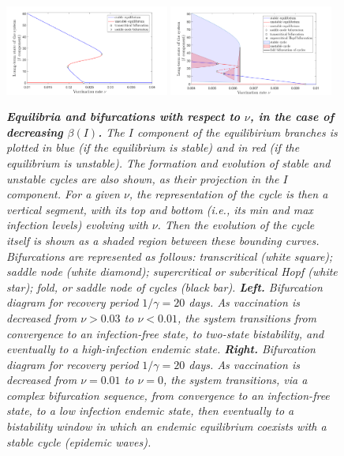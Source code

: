 \documentclass[10pt]{article}
\begin{document}
\begin{figure}[h!]
\begin{center}
\includegraphics[width=0.48\textwidth]{figures/increasing_beta_gamma_20.png}
\includegraphics[width=0.48\textwidth]{figures/increasing_beta_gamma_10.png}
\caption{\emph{{\bf Equilibria and bifurcations with respect to $\nu$, in the case of decreasing $\beta(I)$.} The $I$ component of the equilibirium branches is plotted in blue (if the equilibrium is stable) and in red (if the equilibrium is unstable). The formation and evolution of stable and unstable cycles are also shown, as their projection in the $I$ component. For a given $\nu$, the representation of the cycle is then a vertical segment, with its top and bottom (i.e., its min and max infection levels) evolving with $\nu$. Then the evolution of the cycle itself is shown as a shaded region between these bounding curves. Bifurcations are represented as follows: transcritical (white square); saddle node (white diamond); supercritical or subcritical Hopf (white star); fold, or saddle node of cycles (black bar). {\bf Left.} Bifurcation diagram for recovery period $1/\gamma = 20$ days. As vaccination is decreased from $\nu>0.03$ to $\nu<0.01$, the system transitions from convergence to an infection-free state, to two-state bistability, and eventually to a high-infection endemic state. {\bf Right.} Bifurcation diagram for recovery period $1/\gamma = 20$ days. As vaccination is decreased from $\nu=0.01$ to $\nu=0$, the system transitions, via a complex bifurcation sequence, from convergence to an infection-free state, to a low infection endemic state, then eventually to a bistability window in which an endemic equilibrium coexists with a stable cycle (epidemic waves).}}
\label{increasing_beta}
\end{center}
\end{figure}
\end{document}
